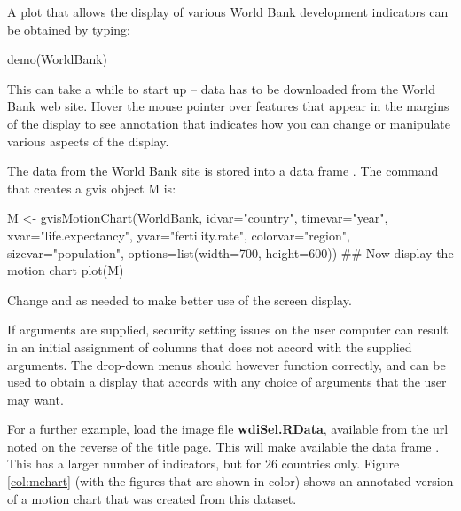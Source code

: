 A plot that allows the display of various World Bank development
indicators can be obtained by typing:
\begin{Schunk}
\begin{Sinput}
demo(WorldBank)
\end{Sinput}
\end{Schunk}
This can take a while to start up -- data has to be downloaded from
the World Bank web site. Hover the mouse pointer over features that
appear in the margins of the display to see annotation that indicates
how you can change or manipulate various aspects of the display.

The data from the World Bank site is stored into a data frame
.  The command that creates a gvis object M
is:
\begin{Schunk}
\begin{Sinput}
M <- gvisMotionChart(WorldBank, idvar="country",
          timevar="year",
          xvar="life.expectancy",
          yvar="fertility.rate",
          colorvar="region", sizevar="population",
          options=list(width=700, height=600))
## Now display the motion chart
plot(M)
\end{Sinput}
\end{Schunk}
Change  and  as needed to make better
use of the screen display.

If arguments are supplied, security setting issues on the user
computer can result in an initial assignment of columns that does not
accord with the supplied arguments.  The drop-down menus should however function
correctly, and can be used to obtain a display that accords with any
choice of arguments that the user may want.

For a further example, load the image file {\bf wdiSel.RData},
available from the url noted on the reverse of the title page. This
will make available the data frame . This has a larger
number of indicators, but for 26 countries only.  Figure
\ref{col:mchart} (with the figures that are shown in color) shows an
annotated version of a motion chart that was created from this
dataset.

